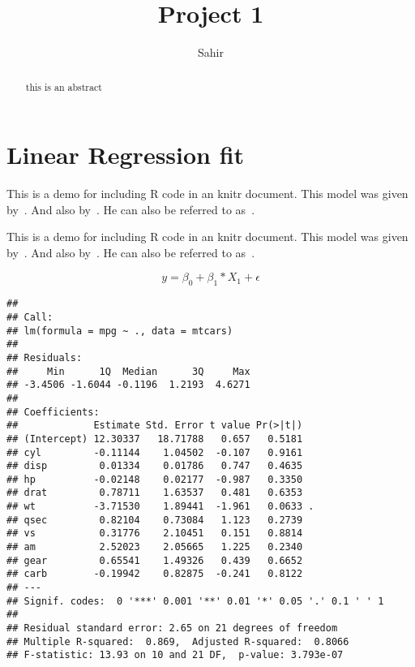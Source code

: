 \documentclass[]{article}\usepackage[]{graphicx}\usepackage[]{color}
\title{Project 1}
\author{Sahir}
\makeatletter
\newenvironment{kframe}{%
 \def\at@end@of@kframe{}%
 \ifinner\ifhmode%
  \def\at@end@of@kframe{\end{minipage}}%
  \begin{minipage}{\columnwidth}%
 \fi\fi%
 \def\FrameCommand##1{\hskip\@totalleftmargin \hskip-\fboxsep
 \colorbox{shadecolor}{##1}\hskip-\fboxsep
     \hskip-\linewidth \hskip-\@totalleftmargin \hskip\columnwidth}%
 \MakeFramed {\advance\hsize-\width
   \@totalleftmargin\z@ \linewidth\hsize
   \@setminipage}}%
 {\par\unskip\endMakeFramed%
 \at@end@of@kframe}
\newenvironment{knitrout}{}{} %
\makeatother
\begin{document}
\maketitle
\begin{abstract}
this is an abstract
\end{abstract}


\section{Linear Regression fit}

This is a demo for including R code in an knitr document. This model was given by~\citep{breiman1996bagging}.
And also by~\citep{yang2017insurance}. He can also be referred to as~\citep{breiman1999prediction}.

This is a demo for including R code in an knitr document. This model was given by~\cite{breiman1996bagging}.
And also by~\cite{yang2017insurance}. He can also be referred to as~\cite{breiman1999prediction}.


\begin{equation}
y = \beta_0 + \beta_1 * X_1 + \epsilon
\end{equation}

\begin{knitrout}
\color{fgcolor}\begin{kframe}
\begin{verbatim}
## 
## Call:
## lm(formula = mpg ~ ., data = mtcars)
## 
## Residuals:
##     Min      1Q  Median      3Q     Max 
## -3.4506 -1.6044 -0.1196  1.2193  4.6271 
## 
## Coefficients:
##             Estimate Std. Error t value Pr(>|t|)  
## (Intercept) 12.30337   18.71788   0.657   0.5181  
## cyl         -0.11144    1.04502  -0.107   0.9161  
## disp         0.01334    0.01786   0.747   0.4635  
## hp          -0.02148    0.02177  -0.987   0.3350  
## drat         0.78711    1.63537   0.481   0.6353  
## wt          -3.71530    1.89441  -1.961   0.0633 .
## qsec         0.82104    0.73084   1.123   0.2739  
## vs           0.31776    2.10451   0.151   0.8814  
## am           2.52023    2.05665   1.225   0.2340  
## gear         0.65541    1.49326   0.439   0.6652  
## carb        -0.19942    0.82875  -0.241   0.8122  
## ---
## Signif. codes:  0 '***' 0.001 '**' 0.01 '*' 0.05 '.' 0.1 ' ' 1
## 
## Residual standard error: 2.65 on 21 degrees of freedom
## Multiple R-squared:  0.869,	Adjusted R-squared:  0.8066 
## F-statistic: 13.93 on 10 and 21 DF,  p-value: 3.793e-07
\end{verbatim}
\end{kframe}
\end{knitrout}
\end{document}
